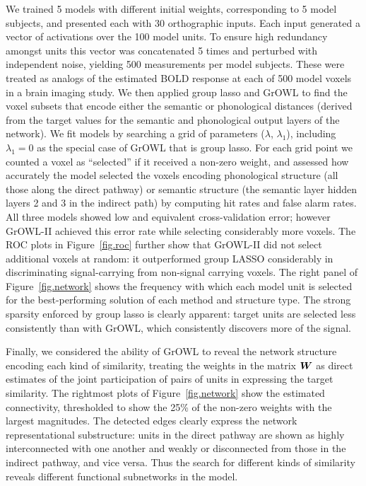 We trained 5 models with different initial weights, corresponding to 5 model
subjects, and presented each with 30 orthographic inputs. Each input generated a
vector of activations over the 100 model units. To ensure high redundancy
amongst units this vector was concatenated 5 times and perturbed with
independent noise, yielding 500 measurements per model subjects. These were
treated as analogs of the estimated BOLD response at each of 500 model voxels in
a brain imaging study. We then applied group lasso and GrOWL to find the voxel
subsets that encode either the semantic or phonological distances (derived from
the target values for the semantic and phonological output layers of the
network). We fit models by searching a grid of parameters ($\lambda$,
$\lambda_1$), including $\lambda_1=0$ as the special case of GrOWL that is group
lasso. For each grid point we counted a voxel as ``selected'' if it received a
non-zero weight, and assessed how accurately the model selected  the voxels
encoding phonological structure (all those along the direct pathway) or semantic
structure (the semantic layer hidden layers 2 and 3 in the indirect path) by
computing hit rates and false alarm rates. All three models showed low and
equivalent cross-validation error; however GrOWL-II achieved this error rate
while selecting considerably more voxels. The ROC plots in Figure~\ref{fig.roc}
further show that GrOWL-II did not select additional voxels at random: it
outperformed group LASSO considerably in discriminating signal-carrying from
non-signal carrying voxels. The right panel of Figure~\ref{fig.network} shows
the frequency with which each model unit is selected for the best-performing
solution of each method and structure type. The strong sparsity enforced by
group lasso is clearly apparent: target units are selected less consistently
than with GrOWL, which consistently discovers more of the signal.

Finally, we considered the ability of GrOWL to reveal the network structure
encoding each kind of similarity, treating the weights in the matrix $\boldsymbol{W}$ as
direct estimates of the joint participation of pairs of units in expressing the
target similarity. The rightmost plots of Figure~\ref{fig.network} show the
estimated connectivity, thresholded to show the 25\% of the non-zero weights
with the largest magnitudes. The detected edges clearly express the network
representational substructure: units in the direct pathway are shown as highly
interconnected with one another and weakly or disconnected from those in the
indirect pathway, and vice versa. Thus the search for different kinds of
similarity reveals different functional subnetworks in the model.

